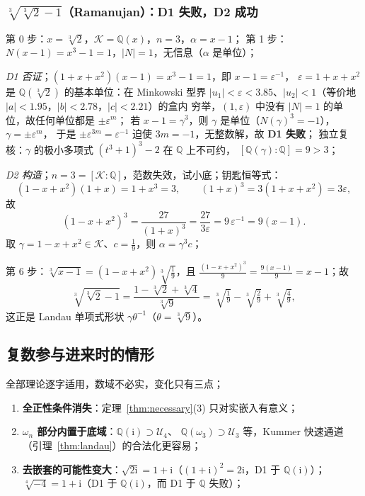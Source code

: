 \documentclass[UTF8,a4paper,11pt]{ctexart}
\newcommand{\ii}{\mathrm{i}}
\begin{document}
\subsubsection{$\sqrt[3]{\sqrt[3]2-1}$（Ramanujan）：D1 失败，D2 成功}
\label{ex:ramanujan}

第 0 步：$x=\sqrt[3]2$，$\mathscr{K}=\mathbb{Q}(x)$，$n=3$，$\alpha=x-1$；
第 1 步：$N(x-1)=x^3-1=1$，$|N|=1$，无信息（$\alpha$ 是单位）；\par

\emph{D1 否证}；$(1+x+x^2)(x-1)=x^3-1=1$，即 $x-1=\varepsilon^{-1}$，
$\varepsilon=1+x+x^2$ 是 $\mathbb{Q}(\sqrt[3]2)$ 的基本单位：在 Minkowski 型界
$|u_1|<\varepsilon<3.85$、$|u_2|<1$（等价地 $|a|<1.95$，$|b|<2.78$，$|c|<2.21$）的盒内
穷举，$(1,\varepsilon)$ 中没有 $|N|=1$ 的单位，故任何单位都是 $\pm\varepsilon^m$；
若 $x-1=\gamma^3$，则 $\gamma$ 是单位（$N(\gamma)^3=-1$），$\gamma=\pm\varepsilon^m$，
于是 $\pm\varepsilon^{3m}=\varepsilon^{-1}$ 迫使 $3m=-1$，无整数解，故 \textbf{D1 失败}；
独立复核：$\gamma$ 的极小多项式 $(t^3+1)^3-2$ 在 $\mathbb{Q}$ 上不可约，
$[\mathbb{Q}(\gamma):\mathbb{Q}]=9>3$；\par

\emph{D2 构造}；$n=3=[\mathscr{K}:\mathbb{Q}]$，范数失效，试小底；钥匙恒等式：
\[
(1-x+x^2)(1+x)=1+x^3=3,\qquad (1+x)^3=3(1+x+x^2)=3\varepsilon,
\]
故
\[
(1-x+x^2)^3=\frac{27}{(1+x)^3}=\frac{27}{3\varepsilon}=9\,\varepsilon^{-1}=9(x-1).
\]
取 $\gamma=1-x+x^2\in\mathscr{K}$、$c=\tfrac19$，则 $\alpha=\gamma^3c$；\par

第 6 步：$\sqrt[3]{x-1}=(1-x+x^2)\sqrt[3]{\tfrac19}$，且
$\frac{(1-x+x^2)^3}9=\frac{9(x-1)}9=x-1$；故
\[
\sqrt[3]{\sqrt[3]2-1}=\frac{1-\sqrt[3]2+\sqrt[3]4}{\sqrt[3]9}
=\sqrt[3]{\tfrac19}-\sqrt[3]{\tfrac29}+\sqrt[3]{\tfrac49},
\]
这正是 Landau 单项式形状 $\gamma\theta^{-1}$（$\theta=\sqrt[3]9$）。
\subsection{复数参与进来时的情形}
\label{sec:complex}

全部理论逐字适用，数域不必实，变化只有三点；\par

\begin{enumerate}
\item \textbf{全正性条件消失}：定理~\ref{thm:necessary}(3) 只对实嵌入有意义；
\item \textbf{$\omega_n$ 部分内置于底域}：$\mathbb{Q}(\ii)\supset\mathscr{U}_4$、
$\mathbb{Q}(\omega_3)\supset\mathscr{U}_3$ 等，Kummer 快速通道（引理~\ref{thm:landau}）的合法化更容易；
\item \textbf{去嵌套的可能性变大}：$\sqrt{2\ii}=1+\ii$（$(1+\ii)^2=2\ii$，D1 于
$\mathbb{Q}(\ii)$）；$\sqrt[4]{-4}=1+\ii$（D1 于 $\mathbb{Q}(\ii)$，而 D1 于 $\mathbb{Q}$ 失败）；
\end{enumerate}
\end{document}
